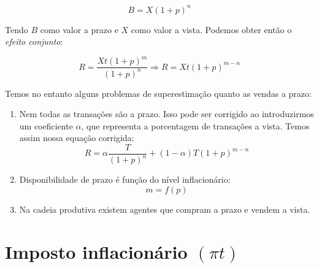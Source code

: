 \documentclass[12pt,a4paper,oneside,brazil]{abntex2}
\begin{document}
\begin{equation} \label{vendas_a_prazo}
	B = X (1 + p)^n
\end{equation}

Tendo $B$ como valor a prazo e $X$ como valor a vista. Podemos obter então o \emph{efeito conjunto}:

\begin{equation} \label{efeito_conjunto}
	R = \frac{X t (1 + p)^m}{(1 + p)^n} \Rightarrow R = X t (1 + p)^{m - n}
\end{equation}

Temos no entanto alguns problemas de superestimação quanto as vendas a prazo:
\begin{enumerate}
	\item Nem todas as transações são a prazo. Isso pode ser corrigido ao introduzirmos um coeficiente $\alpha$, que representa a porcentagem de transações a vista. Temos assim nossa equação corrigida:
	\begin{equation} \label{efeito_corrigido}
		R = \alpha \frac{T}{(1 + p)^n} + (1 - \alpha) T (1 + p)^{m - n}
	\end{equation}
	\item Disponibilidade de prazo é função do nível inflacionário:
	\begin{equation}
		m = f(p)
	\end{equation} 
	\item Na cadeia produtiva existem agentes que compram a prazo e vendem a vista.
\end{enumerate} 

\section{Imposto inflacionário $(\pi t)$}


\printbibliography
\end{document}
